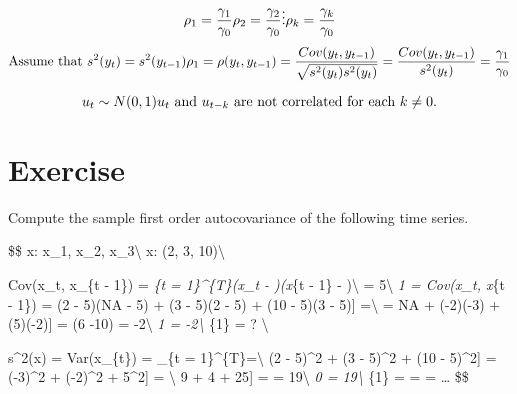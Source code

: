 \documentclass[
]{book}
\begin{document}
\[
\rho_1 = \frac{\gamma_1}{\gamma_0} \\
\rho_2 = \frac{\gamma_2}{\gamma_0} \\
\vdots\\
\rho_k = \frac{\gamma_k}{\gamma_0}\\
\]
\[
\text{Assume that } s^2(y_t) = s^2(y_{t - 1}) \\
\rho_{1} = \rho(y_t, y_{t - 1}) = \frac{Cov(y_t, y_{t - 1})}{\sqrt{s^2(y_t)s^2(y_{t})}} = \frac{Cov(y_t, y_{t - 1})}{s^2(y_t)} = \frac{\gamma_1}{\gamma_0}
\]

\[
u_t \sim N(0, 1) \\
u_{t} \text{ and } u_{t - k} \text{ are not correlated for each } k \neq 0.
\]

\hypertarget{exercise}{%
\section{Exercise}\label{exercise}}

Compute the sample first order autocovariance of the following time series.

\$\$
x: x\_1, x\_2, x\_3\textbackslash{}
x: (2, 3, 10)\textbackslash{}

Cov(x\_t, x\_\{t - 1\}) = \sum\emph{\{t = 1\}\^{}\{T\}(x\_t - )(x}\{t - 1\} - )\textbackslash{}
 = 5\textbackslash{}
\gamma\emph{1 = Cov(x\_t, x}\{t - 1\}) = \frac{1}{3 - 1}{[}(2 - 5)(NA - 5) + (3 - 5)(2 - 5) + (10 - 5)(3 - 5){]} =\textbackslash{}
= \frac{1}{2}{[}NA + (-2)(-3) + (5)(-2){]} = (6 -10) = -2\textbackslash{}
\gamma\emph{1 = -2\textbackslash{}
\rho}\{1\} = ? \textbackslash{}

s\^{}2(x) = Var(x\_\{t\}) = \sum\_\{t = 1\}\^{}\{T\} =\textbackslash{}
\frac{1}{3 - 1}{[}(2 - 5)\^{}2 + (3 - 5)\^{}2 + (10 - 5)\^{}2{]} = \frac{1}{2}{[}(-3)\^{}2 + (-2)\^{}2 + 5\^{}2{]} = \textbackslash{}
\frac{1}{2}{[}9 + 4 + 25{]} =  = 19\textbackslash{}
\gamma\emph{0 = 19\textbackslash{}
\rho}\{1\} =  =  = \ldots{}
\$\$

  
\end{document}
